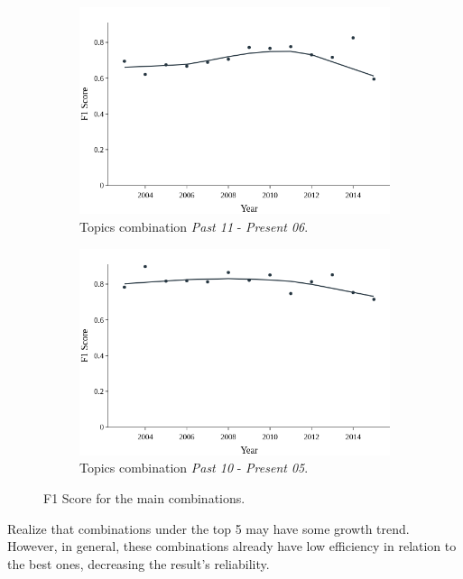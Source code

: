 \begin{figure}[h!]
	\begin{subfigure}{0.5\textwidth}
	\includegraphics[width=\linewidth]{01.Chapters/05.Results/lowess-1}
		\caption{Topics combination \textit{Past 11} - \textit{Present 06}.}
	\end{subfigure}%
	\hfill
	\begin{subfigure}{0.5\textwidth}
		\includegraphics[width=\linewidth]{01.Chapters/05.Results/lowess-2}
		\caption{Topics combination \textit{Past 10} - \textit{Present 05}.}
	\end{subfigure}%
	\caption{F1 Score for the main combinations.}
	\label{fig:isolated-topics}
\end{figure}

\newpage
Realize that combinations under the top 5 may have some growth trend. However, in general, these combinations already have low efficiency in relation to the best ones, decreasing the result's reliability.


